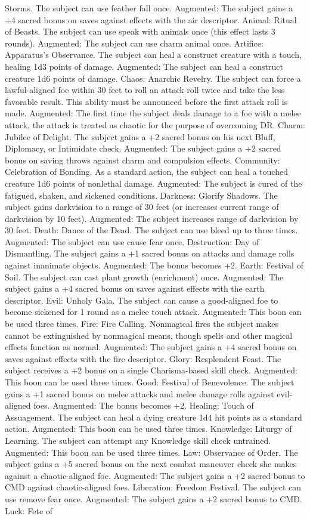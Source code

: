 Storms. The subject can use feather fall once. Augmented: The subject gains a +4 sacred bonus on saves against effects with the air descriptor.  Animal: Ritual of Beasts. The subject can use speak with animals once (this effect lasts 3 rounds). Augmented: The subject can use charm animal once.  Artifice: Apparatus's Observance. The subject can heal a construct creature with a touch, healing 1d3 points of damage. Augmented: The subject can heal a construct creature 1d6 points of damage.  Chaos: Anarchic Revelry. The subject can force a lawful-aligned foe within 30 feet to roll an attack roll twice and take the less favorable result. This ability must be announced before the first attack roll is made. Augmented: The first time the subject deals damage to a foe with a melee attack, the attack is treated as chaotic for the purpose of overcoming DR.  Charm: Jubilee of Delight. The subject gains a +2 sacred bonus on his next Bluff, Diplomacy, or Intimidate check. Augmented: The subject gains a +2 sacred bonus on saving throws against charm and compulsion effects.  Community: Celebration of Bonding. As a standard action, the subject can heal a touched creature 1d6 points of nonlethal damage. Augmented: The subject is cured of the fatigued, shaken, and sickened conditions.  Darkness: Glorify Shadows. The subject gains darkvision to a range of 30 feet (or increases current range of darkvision by 10 feet). Augmented: The subject increases range of darkvision by 30 feet.  Death: Dance of the Dead. The subject can use bleed up to three times. Augmented: The subject can use cause fear once.  Destruction: Day of Dismantling. The subject gains a +1 sacred bonus on attacks and damage rolls against inanimate objects. Augmented: The bonus becomes +2.  Earth: Festival of Soil. The subject can cast plant growth (enrichment) once. Augmented: The subject gains a +4 sacred bonus on saves against effects with the earth descriptor.  Evil: Unholy Gala. The subject can cause a good-aligned foe to become sickened for 1 round as a melee touch attack. Augmented: This boon can be used three times.  Fire: Fire Calling. Nonmagical fires the subject makes cannot be extinguished by nonmagical means, though spells and other magical effects function as normal. Augmented: The subject gains a +4 sacred bonus on saves against effects with the fire descriptor.  Glory: Resplendent Feast. The subject receives a +2 bonus on a single Charisma-based skill check. Augmented: This boon can be used three times.  Good: Festival of Benevolence. The subject gains a +1 sacred bonus on melee attacks and melee damage rolls against evil-aligned foes. Augmented: The bonus becomes +2.  Healing: Touch of Assuagement. The subject can heal a dying creature 1d4 hit points as a standard action. Augmented: This boon can be used three times.  Knowledge: Liturgy of Learning. The subject can attempt any Knowledge skill check untrained. Augmented: This boon can be used three times.  Law: Observance of Order. The subject gains a +5 sacred bonus on the next combat maneuver check she makes against a chaotic-aligned foe. Augmented: The subject gains a +2 sacred bonus to CMD against chaotic-aligned foes.  Liberation: Freedom Festival. The subject can use remove fear once. Augmented: The subject gains a +2 sacred bonus to CMD.  Luck: Fete of 